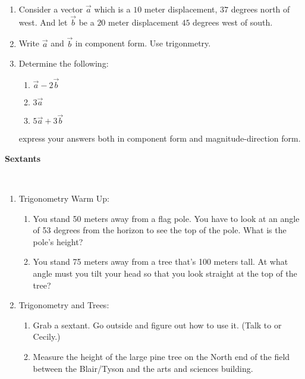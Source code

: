 \documentclass[12pt]{article}
\begin{document}
\begin{enumerate}

\item Consider a vector $\vec{a}$ which is a $10$ meter displacement,
  $37$ degrees north of west.  And let $\vec{b}$ be a $20$ meter
  displacement $45$ degrees west of south.

\item Write $\vec{a}$ and $\vec{b}$ in component form.  Use
  trigonmetry. 

\item Determine the following:
\begin{enumerate}
\setlength{\itemsep}{0mm}
  \item $\vec{a} - 2\vec{b}$
  \item $3\vec{a}$
  \item $5 \vec{a} + 3 \vec{b}$
\end{enumerate}
express your answers both in component form and magnitude-direction
form. 


\end{enumerate}

\newpage

\begin{center}
  {\bf Sextants }\\
\end{center}

\hspace{2mm}\\

\begin{enumerate}

\item Trigonometry Warm Up:
\begin{enumerate}
\setlength{\itemsep}{0mm}
  \item You stand 50 meters away from a flag pole.  You have to look
  at an angle of 53 degrees from the horizon to see the top of the
  pole.  What is the pole's height? 

  \item You stand 75 meters away from a tree that's 100 meters tall.
  At what angle must you tilt your head so that you look straight at
  the top of the tree? 

\end{enumerate} 

\item Trigonometry and Trees:

\begin{enumerate}
\setlength{\itemsep}{0mm}
  \item Grab a sextant.  Go outside and figure out how to use it.
  (Talk to or Cecily.) 

  \item Measure the height of the large pine tree on the North end of
  the field between the Blair/Tyson and the arts and sciences
  building.  
\end{enumerate}

\end{enumerate}
\end{document}
